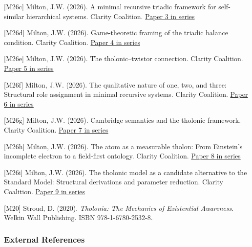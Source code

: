\documentclass[12pt]{article}
\begin{document}
{[}M26c{]} Milton, J.W. (2026). A minimal recursive triadic framework
for self-similar hierarchical systems. Clarity Coalition.
\href{https://github.com/baardev/truevalue/blob/main/docnav/Research/papers/3_minimal-recursive-triadic-framework/3_minimal-recursive-triadic-framework.pdf}{Paper
3 in series}

{[}M26d{]} Milton, J.W. (2026). Game-theoretic framing of the triadic
balance condition. Clarity Coalition.
\href{https://github.com/baardev/truevalue/blob/main/docnav/Research/papers/4_game-theoretic-triadic-balance/4_game-theoretic-triadic-balance.pdf}{Paper
4 in series}

{[}M26e{]} Milton, J.W. (2026). The tholonic--twistor connection.
Clarity Coalition.
\href{https://github.com/baardev/truevalue/blob/main/docnav/Research/papers/5_tholonic-twistor-connection/5_tholonic-twistor-connection.pdf}{Paper
5 in series}

{[}M26f{]} Milton, J.W. (2026). The qualitative nature of one, two, and
three: Structural role assignment in minimal recursive systems. Clarity
Coalition.
\href{https://github.com/baardev/truevalue/blob/main/docnav/Research/papers/6_qualitative-nature-integers-triadic-roles/6_qualitative-nature-integers-triadic-roles.pdf}{Paper
6 in series}

{[}M26g{]} Milton, J.W. (2026). Cambridge semantics and the tholonic
framework. Clarity Coalition.
\href{https://github.com/baardev/truevalue/blob/main/docnav/Research/papers/7_cambridge-semantics-tholonic-framework/7_cambridge-semantics-tholonic-framework.pdf}{Paper
7 in series}

{[}M26h{]} Milton, J.W. (2026). The atom as a measurable tholon: From
Einstein's incomplete electron to a field-first ontology. Clarity
Coalition.
\href{https://github.com/baardev/truevalue/blob/main/docnav/Research/papers/8_atom-as-tholon-measurable-phenomena/8_atom-as-tholon-measurable-phenomena.pdf}{Paper
8 in series}

{[}M26i{]} Milton, J.W. (2026). The tholonic model as a candidate
alternative to the Standard Model: Structural derivations and parameter
reduction. Clarity Coalition.
\href{https://github.com/baardev/truevalue/blob/main/docnav/Research/papers/9_tholonic-model-standard-model-alternative/9_tholonic-model-standard-model-alternative.pdf}{Paper
9 in series}

{[}M20{]} Stroud, D. (2020). \emph{Tholonia: The Mechanics of
Existential Awareness}. Welkin Wall Publishing. ISBN 978-1-6780-2532-8.

\subsubsection{External References}\label{external-references}
\end{document}
